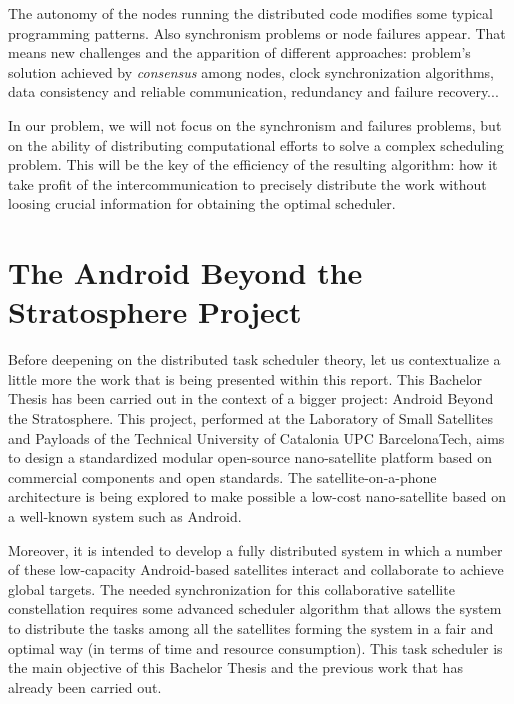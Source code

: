 The autonomy of the nodes running the distributed code modifies some typical programming patterns. Also synchronism problems or node failures appear. That means new challenges and the apparition of different approaches: problem's solution achieved by \emph{consensus} among nodes, clock synchronization algorithms, data consistency and reliable communication, redundancy and failure recovery... \citep{Tanenbaum:2006:DSP:1202502}

In our problem, we will not focus on the synchronism and failures problems, but on the ability of distributing computational efforts to solve a complex scheduling problem. This will be the key of the efficiency of the resulting algorithm: how it take profit of the intercommunication to precisely distribute the work without loosing crucial information for obtaining the optimal scheduler.


\section{The Android Beyond the Stratosphere Project}

Before deepening on the distributed task scheduler theory, let us contextualize a little more the work that is being presented within this report. This Bachelor Thesis has been carried out in the context of a bigger project: Android Beyond the Stratosphere. This project, performed at the Laboratory of Small Satellites and Payloads of the Technical University of Catalonia UPC BarcelonaTech, aims to design a standardized modular open-source nano-satellite platform based on commercial components and open standards. The satellite-on-a-phone architecture is being explored to make possible a low-cost nano-satellite based on a well-known system such as Android.

Moreover, it is intended to develop a fully distributed system in which a number of these low-capacity Android-based satellites interact and collaborate to achieve global targets. The needed synchronization for this collaborative satellite constellation requires some advanced scheduler algorithm that allows the system to distribute the tasks among all the satellites forming the system in a fair and optimal way (in terms of time and resource consumption). This task scheduler is the main objective of this Bachelor Thesis and the previous work that has already been carried out.

